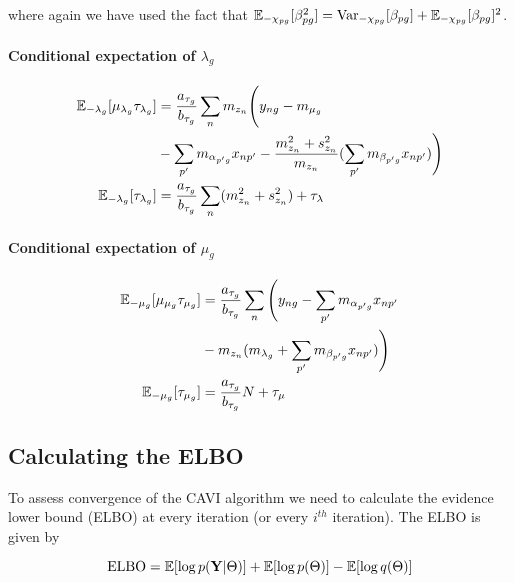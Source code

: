 where again we have used the fact that $\mathbb{E}_{-\chi_{pg}}[\beta_{pg}^2] =
\text{Var}_{-\chi_{pg}}[\beta_{pg}] +
\mathbb{E}_{-\chi_{pg}}[\beta_{pg}]^2$.

\paragraph{Conditional expectation of $\lambda_g$}

\begin{equation}
\begin{aligned}
\mathbb{E}_{-\lambda_g}[\mu_{\lambda_g} \tau_{\lambda_g}] & = \frac{a_{\tau_g}}{b_{\tau_g}}
\sum_n m_{z_n} \Bigg(
y_{ng} - m_{\mu_g} \\
&  - \sum_{p'} m_{\alpha_{p'g}} x_{np'} -
\frac{m_{z_n}^2 + s_{z_n}^2}{m_{z_n}} (\sum_{p'} m_{\beta_{p'g}} x_{np'})
\Bigg) \\
\mathbb{E}_{-\lambda_g}[\tau_{\lambda_g}] & = \frac{a_{\tau_g}}{b_{\tau_g}} \sum_n(m_{z_n}^2 + s_{z_n}^2) + \tau_\lambda
\end{aligned}
\end{equation}

\paragraph{Conditional expectation of $\mu_g$}

\begin{equation}
\begin{aligned}
\mathbb{E}_{-\mu_g}[\mu_{\mu_g} \tau_{\mu_g}] & =  \frac{a_{\tau_g}}{b_{\tau_g} }
\sum_n \Bigg(
y_{ng} - \sum_{p'} m_{\alpha_{p'g}} x_{np'} \\
& - m_{z_n}(
m_{\lambda_g} + \sum_{p'} m_{\beta_{p'g}} x_{np'})
\Bigg) \\
\mathbb{E}_{-\mu_g}[\tau_{\mu_g}] & =  \frac{a_{\tau_g}}{b_{\tau_g}} N + \tau_\mu
\end{aligned}
\end{equation}

\subsection{Calculating the ELBO}

To assess convergence of the CAVI algorithm we need to calculate the evidence lower bound (ELBO) at every iteration (or every $i^{th}$ iteration). The ELBO is given by

\begin{equation}
\text{ELBO} = \mathbb{E}[\log p({\bf Y} | \Theta)] + \mathbb{E}[\log p(\Theta)] - \mathbb{E}[\log q(\Theta)]
\end{equation}

